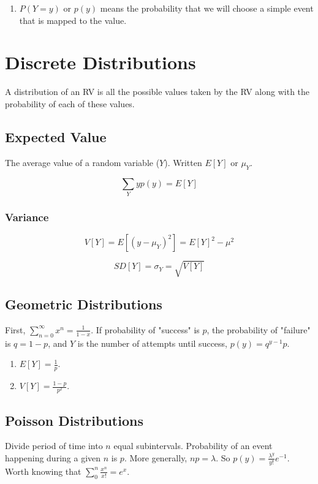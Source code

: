 \documentclass{article}
\begin{document}
\begin{enumerate}
\item $P(Y=y)$ or $p(y)$ means the probability that we will choose a simple
  event that is mapped to the value.
\end{enumerate}

\section{Discrete Distributions}
A distribution of an RV is all the possible values taken by the RV along with
the probability of each of these values.

\subsection{Expected Value}
The average value of a random variable ($Y$). Written $E[Y]$ or $\mu_Y$.

\begin{equation}
\sum_Y y p(y) = E[Y]
\end{equation}

\subsubsection{Variance}
\begin{equation}
V[Y] = E[(y-\mu_Y)^2] = E[Y]^2 - \mu^2
\end{equation}

\begin{equation}
SD[Y] = \sigma_Y = \sqrt{V[Y]}
\end{equation}

\subsection{Geometric Distributions}
First, $\sum_{n=0}^{\infty} x^n = \frac{1}{1-x}$. If probability of "success"
is $p$, the probability of "failure" is $q=1-p$, and $Y$ is the number of
attempts until success, $p(y)=q^{y-1}p$.

\begin{enumerate}
  \item $E[Y] = \frac{1}{p}$.
  \item $V[Y] = \frac{1-p}{p^2}$.
\end{enumerate}

\subsection{Poisson Distributions}
Divide period of time into $n$ equal subintervals. Probability of an event
happening during a given $n$ is $p$. More generally, $np = \lambda$. So
$p(y)=\frac{\lambda^y}{y!}e^{-1}$. Worth knowing that
$\sum_{0}^{n}\frac{x^n}{x!}=e^x$.
\end{document}
